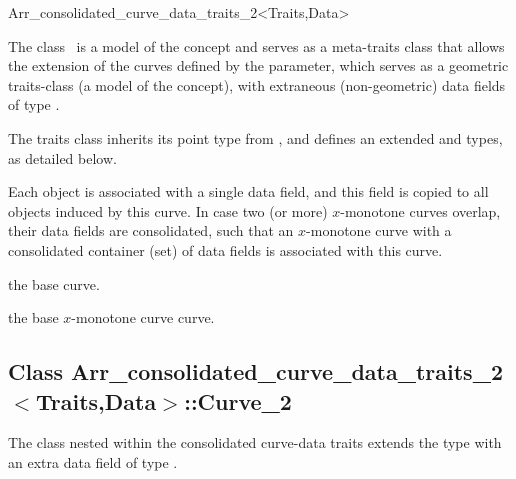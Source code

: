
\ccRefPageBegin
\begin{ccRefClass}{Arr_consolidated_curve_data_traits_2<Traits,Data>}

\ccDefinition

The class \ccRefName\ is a model of the  concept
and serves as a meta-traits class that allows the extension of the curves
defined by the  parameter, which serves as a geometric
traits-class (a model of the  concept), with
extraneous (non-geometric) data fields of type .

The traits class inherits its point type from ,
and defines an extended  and  types,
as detailed below.

Each  object is associated with a single data field, and this 
field is copied to all  objects induced by this curve.
In case two (or more) $x$-monotone curves overlap, their data fields are
consolidated, such that an $x$-monotone curve with a consolidated container
(set) of data fields is associated with this curve.

 
\ccIsModel

\ccInheritsFrom

\ccTypes

    {the base curve.}

    {the base $x$-monotone curve curve.}

\subsection*{Class 
 Arr\_consolidated\_curve\_data\_traits\_2$<$Traits,Data$>$::Curve\_2}

The  class nested within the consolidated curve-data traits
extends the  type with an extra data field of type
.


\end{ccRefClass}
